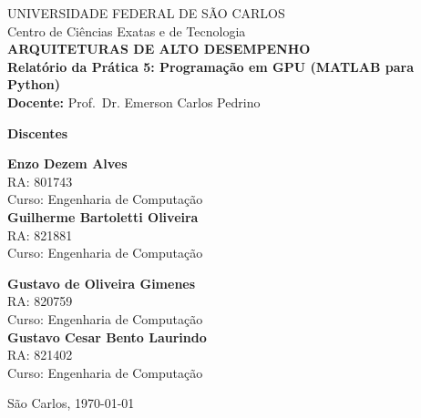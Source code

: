\documentclass[12pt,a4paper]{article}
\begin{document}
\begin{titlepage}
    \begin{center}
        \large
        UNIVERSIDADE FEDERAL DE SÃO CARLOS\\
        Centro de Ciências Exatas e de Tecnologia\\[1.5cm]

        \LARGE \textbf{ARQUITETURAS DE ALTO DESEMPENHO}\\[0.5cm]
        \Large \textbf{Relatório da Prática 5: Programação em GPU (MATLAB para Python)}\\[1.5cm]

        \large
        \textbf{Docente:} Prof.\ Dr. Emerson Carlos Pedrino\\[1.0cm]

        \vspace*{\fill}
        
        \large \textbf{Discentes}\\[0.8cm]

        \begin{minipage}[t]{0.48\textwidth}
            \centering
            \textbf{Enzo Dezem Alves}\\
            RA: 801743\\
            Curso: Engenharia de Computação\\[0.8cm]

            \textbf{Guilherme Bartoletti Oliveira}\\
            RA: 821881\\
            Curso: Engenharia de Computação
        \end{minipage}%
        \hfill
        \begin{minipage}[t]{0.48\textwidth}
            \centering
            \textbf{Gustavo de Oliveira Gimenes}\\
            RA: 820759\\
            Curso: Engenharia de Computação\\[0.8cm]

            \textbf{Gustavo Cesar Bento Laurindo}\\
            RA: 821402\\
            Curso: Engenharia de Computação
        \end{minipage}
        
        \vspace*{\fill}
        
        \vspace{1cm}
        São Carlos, \today
    \end{center}
\end{titlepage}
\end{document}

